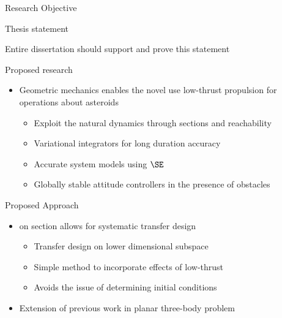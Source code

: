 
\begin{frame}[t]{Research Objective}
    
    Thesis statement

    Entire dissertation should support and prove this statement

\end{frame}

\begin{frame}[t]{Proposed research}
    \begin{itemize}
        \item Geometric mechanics enables the novel use low-thrust propulsion for operations about asteroids
        \begin{itemize}     
            \item Exploit the natural dynamics through \Poincare sections and reachability
            \item Variational integrators for long duration accuracy
            \item Accurate system models using \( \SE \)
            \item Globally stable attitude controllers in the presence of obstacles
        \end{itemize}
    \end{itemize}

\end{frame}

\begin{frame}[t]{Proposed Approach} %
  \begin{itemize}
      \item {} on \Poincare section allows for systematic transfer design
        \begin{itemize}
            \item Transfer design on lower dimensional subspace
            \item Simple method to incorporate effects of low-thrust 
            \item Avoids the issue of determining initial conditions
        \end{itemize}
        \pause
      \item Extension of previous work in planar three-body problem     
  \end{itemize}

\end{frame} %

